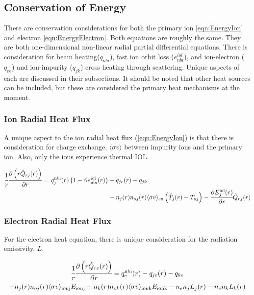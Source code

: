 \subsection{Conservation of Energy} \label{sub:EnergyConservation}

There are conservation considerations for both the primary ion \cref{eqn:EnergyIon} and electron \cref{eqn:EnergyElectron}. Both equations are roughly the same. They are both one-dimensional non-linear radial partial differential equations. There is consideration for beam heating($q_{nbi}$), fast ion orbit loss ($e_{nbi}^{iol}$), and ion-electron ($q_{re}$)  and ion-impurity ($q_{jk}$) cross heating through scattering.  Unique aspects of each are discussed in their subsections. It should be noted that other heat sources can be included, but these are considered the primary heat mechanisms at the moment.

\subsubsection{Ion Radial Heat Flux} \label{subsub:IonRadialHeatFlux}

A unique aspect to the ion radial heat flux (\cref{eqn:EnergyIon}) is that there is consideration for charge exchange, $\langle\sigma v \rangle$ between impurity ions and the primary ion. Also, only the ions experience thermal \ac{IOL}. 

\begin{align} \label{eqn:EnergyIon}
	\cfrac{1}{r}\cfrac{\partial \left(r\hat{Q}_{rj}(r)\right)}{\partial r} = \, q_j^\mathrm{nbi}(r) \left( 1 - \hat{\alpha} e_\mathrm{nbi}^\mathrm{iol}(r) \right) 
	&- q_{je}(r) - q_{jk} \nonumber \\
	&- n_j(r)n_{oj}(r) \langle \sigma v \rangle_\mathrm{cx} \left(\hat{T}_j(r)-T_{oj}\right) -
	\cfrac{\partial E_j^\mathrm{iol}(r)}{\partial r} \hat{Q}_{rj}(r)
\end{align}

\subsubsection{Electron Radial Heat Flux} \label{subsub:ElectronRadialHeatFlux}

For the electron heat equation, there is unique consideration for the radiation emissivity, $L$. 

\begin{multline} \label{eqn:EnergyElectron}
	\cfrac{1}{r}\cfrac{\partial \left(r\hat{Q}_{re}(r)\right)}{\partial r} = q_e^\mathrm{nbi}(r) - q_{je}(r) - q_{ke}  \\
	- n_j(r)n_{oj}(r) \langle \sigma v \rangle_\mathrm{ionj} E_\mathrm{ionj} -
	n_k(r)n_{ok}(r) \langle \sigma v \rangle_\mathrm{ionk} E_\mathrm{ionk} - n_e n_j L_j(r) - n_e n_k L_k(r)
\end{multline}

